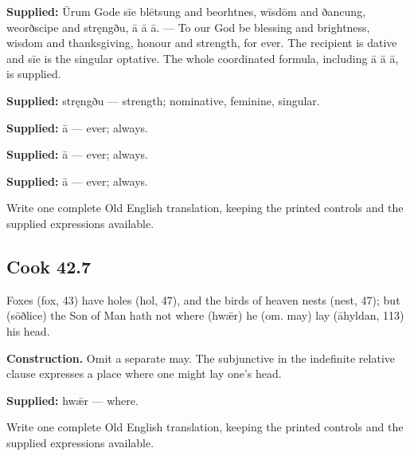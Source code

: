 \textbf{Supplied:} Ūrum Gode sīe blētsung and beorhtnes, wīsdōm and ðancung, weorðscipe and stręngðu, ā ā ā. — To our God be blessing and brightness, wisdom and thanksgiving, honour and strength, for ever. The recipient is dative and sīe is the singular optative. The whole coordinated formula, including ā ā ā, is supplied.

\textbf{Supplied:} stręngðu — strength; nominative, feminine, singular.

\textbf{Supplied:} ā — ever; always.

\textbf{Supplied:} ā — ever; always.

\textbf{Supplied:} ā — ever; always.

Write one complete Old English translation, keeping the printed controls and the supplied expressions available.

\par\begin{minipage}{\linewidth}\raggedright
\subsection*{Cook 42.7}

Foxes (fox, 43) have holes (hol, 47), and the birds of heaven nests (nest, 47); but (sōðlice) the Son of Man hath not where (hwǣr) he (om. may) lay (āhyldan, 113) his head.

\textbf{Construction.} Omit a separate may. The subjunctive in the indefinite relative clause expresses a place where one might lay one’s head.

\end{minipage}\par\addvspace{4pt}

\textbf{Supplied:} hwǣr — where.

Write one complete Old English translation, keeping the printed controls and the supplied expressions available.

